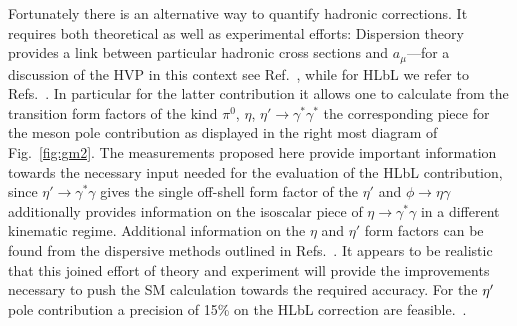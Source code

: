Fortunately there is an alternative way to quantify hadronic corrections. It requires both
theoretical as well as experimental efforts:
Dispersion theory provides a link between particular hadronic cross sections
and $a_\mu$---for a discussion of the HVP in this context see Ref.~\cite{Jegerlehner:2009ry}, while 
for HLbL we refer to Refs.~\cite{Colangelo:2014dfa,Pauk:2014rfa,Colangelo:2014pva,Colangelo:2015ama}.  
In particular for the latter contribution it allows one to calculate from the transition
form factors of the kind $\pi^0$, $\eta$, $\eta'\to \gamma^*\gamma^*$ 
the corresponding piece for the meson pole contribution as displayed in the
right most diagram of Fig.~\ref{fig:gm2}.
The measurements proposed here provide important information towards
the necessary input needed for the evaluation of the HLbL contribution, since
$\eta'\to \gamma^*\gamma$ gives the single off-shell form factor of the $\eta'$
and $\phi\to \eta\gamma$ additionally provides information on the isoscalar
piece of $\eta\to \gamma^*\gamma$ in a different kinematic regime.
Additional information on the  $\eta$ and
$\eta'$ form factors can be found from the dispersive methods outlined in
Refs.~\cite{Adlarson:2011xb,Stollenwerk:2011zz,Hanhart:2013vba,Kubis:2015sga,Xiao:2015uva}.
It  appears to be realistic that this joined effort of theory and experiment
will provide the improvements necessary to push the SM calculation towards
the required accuracy. For the $\eta^{\prime}$ pole contribution a precision of 15\% on the HLbL correction are feasible.~\cite{Nyffeler}.


